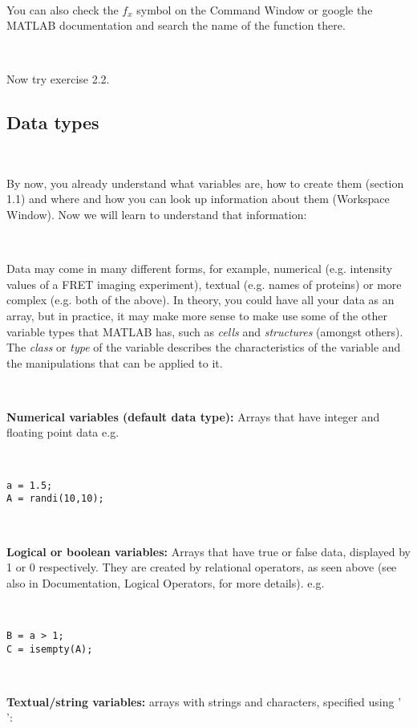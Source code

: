\documentclass[11pt]{amsart}
\begin{document}
\

You can also check the $f_x$ symbol on the Command Window 
or google the MATLAB documentation and search the name of the function there.

\

Now try exercise 2.2.

\subsection{Data types}

\

By now, you already understand what variables are, how to create them (section 1.1) and where and how you can look up information about them (Workspace Window). Now we will learn to understand that information:

\

Data may come in many different forms, for example, numerical (e.g. intensity values of a FRET imaging experiment), textual (e.g. names of proteins) or more complex (e.g. both of the above). In theory, you could have all your data as an array, but in practice, it may make more sense to make use some of the other variable types that MATLAB has, such as {\it cells} and {\it structures} (amongst others). The {\it class} or {\it type} of the variable describes the characteristics of the variable and the manipulations that can be applied to it. 

\

{\bf Numerical variables (default data type):} Arrays that have integer and floating point data
e.g. 

\

\color{blue}
\begin{verbatim}
a = 1.5; 
A = randi(10,10);
\end{verbatim}
\color{black}

\

{\bf Logical or boolean variables:} Arrays that have true or false data, displayed by 1 or 0 respectively. They are created by 
relational operators, as seen above (see also in Documentation, Logical Operators, for more details).
e.g.

\

\color{blue}
\begin{verbatim}
B = a > 1;  
C = isempty(A);
\end{verbatim}
\color{black}

\

{\bf Textual/string variables:} arrays with strings and characters, specified using ' ':
\end{document}
